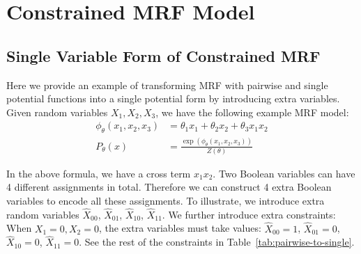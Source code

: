 \section{Constrained MRF Model}\label{appendix:constrain-mrf}

\subsection{Single Variable Form of Constrained MRF}  \label{appendix:svf}
Here we provide an example of transforming MRF with pairwise and single
potential functions into a single potential form by introducing extra
variables. Given random variables $X_1,X_2,X_3$, we have the following example
MRF model:
\begin{align*}
    \phi_{\theta}(x_1,x_2,x_3) & =\theta_1 x_1+\theta_2 x_2+\theta_3 x_1 x_2           \\
    P_{\theta}(x)              & =\frac{\exp(\phi_{\theta}(x_1,x_2,x_3))}{Z({\theta})}
\end{align*}

In the above formula, we have a cross term $x_1 x_2$. Two Boolean variables can
have 4 different assignments in total. Therefore we can construct 4 extra
Boolean variables to encode all these assignments. To illustrate, we introduce
extra random variables $\hat{X}_{00}$, $\hat{X}_{01}$, $\hat{X}_{10}$,
$\hat{X}_{11}$. We further introduce extra constraints: When $X_1=0,X_2=0$, the
extra variables must take values: $\hat{X}_{00}=1$, $\hat{X}_{01}=0$,
$\hat{X}_{10}=0$, $\hat{X}_{11}=0$. See the rest of the constraints in
Table~\ref{tab:pairwise-to-single}.

